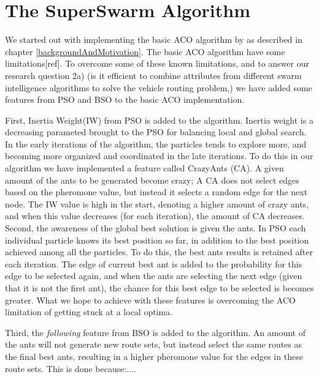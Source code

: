 \section{The SuperSwarm Algorithm}

We started out with implementing the basic ACO algorithm by \citet{nanda11} as described in chapter \ref{backgroundAndMotivation}. The basic ACO algorithm have some limitations[ref]. To overcome some of these known limitations, and to answer our research question 2a) (is it efficient to combine attributes from different swarm intelligence algorithms to solve the vehicle routing problem,) we have added some features from PSO and BSO to the basic ACO implementation.

First, Inertia Weight(IW) from PSO is added to the algorithm. Inertia weight is a decreasing parameted brought to the PSO for balancing local and global search. In the early iterations of the algorithm, the particles tends to explore more, and becoming more organized and coordinated in the late iterations.  To do this in our algorithm we have implemented a feature called CrazyAnts (CA). A given amount of the ants to be generated become crazy; A CA does not select edges based on the pheromone value, but instead it selects a random edge for the next node. The IW value is high in the start, denoting a higher amount of crazy ants, and when this value decreases (for each iteration), the amount of CA decreases. Second, the awareness of the global best solution is given the ants. In PSO each individual particle knows its best position so far, in addition to the best position achieved among all the particles. To do this, the best ants results is retained after each iteration. The edge of current best ant is added to the probability for this edge to be selected again, and when the ants are selecting the next edge (given that it is not the first ant), the chance for this best edge to be selected is becomes greater. What we hope to achieve with these features is overcoming the ACO limitation of getting stuck at a local optima.

Third, the \textit{following} feature from BSO is added to the algorithm. An amount of the ants will not generate new route sets, but instead select the same routes as the final best ants, resulting in a higher pheromone value for the edges in these route sets. This is done because:....




